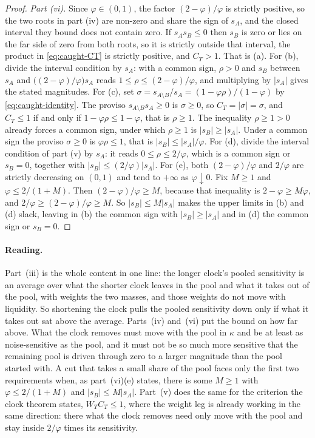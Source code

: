 \begin{proof}
\emph{Part (vi).} Since $\varphi\in(0,1)$, the factor $(2-\varphi)/\varphi$ is strictly positive,
so the two roots in part (iv) are non-zero and share the sign of $s_A$, and the closed interval
they bound does not contain zero. If $s_As_B\le 0$ then $s_B$ is zero or lies on the far side of
zero from both roots, so it is strictly outside that interval, the product in
\eqref{eq:caught-CT} is strictly positive, and $C_T>1$. That is (a). For (b), divide the interval
condition by $s_A$: with a common sign, $\rho>0$ and $s_B$ between $s_A$ and
$\bigl((2-\varphi)/\varphi\bigr)s_A$ reads $1\le\rho\le(2-\varphi)/\varphi$, and multiplying by
$|s_A|$ gives the stated magnitudes. For (c), set
$\sigma = s_{A\setminus B}/s_A = (1-\varphi\rho)/(1-\varphi)$ by \eqref{eq:caught-identity}. The
proviso $s_{A\setminus B}s_A\ge0$ is $\sigma\ge0$, so $C_T = |\sigma| = \sigma$, and $C_T\le1$ if
and only if $1-\varphi\rho\le1-\varphi$, that is $\rho\ge1$. The inequality $\rho\ge1>0$ already
forces a common sign, under which $\rho\ge1$ is $|s_B|\ge|s_A|$. Under a common sign the proviso
$\sigma\ge0$ is $\varphi\rho\le1$, that is $|s_B|\le|s_A|/\varphi$. For (d), divide the interval
condition of part (v) by $s_A$: it reads $0\le\rho\le2/\varphi$, which is a common sign or
$s_B=0$, together with $|s_B|\le(2/\varphi)|s_A|$. For (e), both $(2-\varphi)/\varphi$ and
$2/\varphi$ are strictly decreasing on $(0,1)$ and tend to $+\infty$ as $\varphi\downarrow0$. Fix
$M\ge1$ and $\varphi\le2/(1+M)$. Then $(2-\varphi)/\varphi\ge M$, because that inequality is
$2-\varphi\ge M\varphi$, and $2/\varphi\ge(2-\varphi)/\varphi\ge M$. So $|s_B|\le M|s_A|$ makes
the upper limits in (b) and (d) slack, leaving in (b) the common sign with $|s_B|\ge|s_A|$ and in
(d) the common sign or $s_B=0$.
\end{proof}

\paragraph{Reading.}
Part~(iii) is the whole content in one line: the longer clock's pooled sensitivity is an average
over what the shorter clock leaves in the pool and what it takes out of the pool, with weights the
two masses, and those weights do not move with liquidity. So shortening the clock pulls the pooled
sensitivity down only if what it takes out sat above the average. Parts~(iv) and~(vi) put the
bound on how far above. What the clock removes must move with the pool in $\kappa$ and be at least
as noise-sensitive as the pool, and it must not be so much more sensitive that the remaining pool
is driven through zero to a larger magnitude than the pool started with. A cut that takes a small
share of the pool faces only the first two requirements when, as part~(vi)(e) states, there is
some $M\ge 1$ with $\varphi \le 2/(1+M)$ and $|s_B|\le M|s_A|$. Part~(v) does the same for the criterion
the clock theorem states, $W_T C_T\le1$, where the weight leg is already working in the same
direction: there what the clock removes need only move with the pool and stay inside $2/\varphi$
times its sensitivity.

